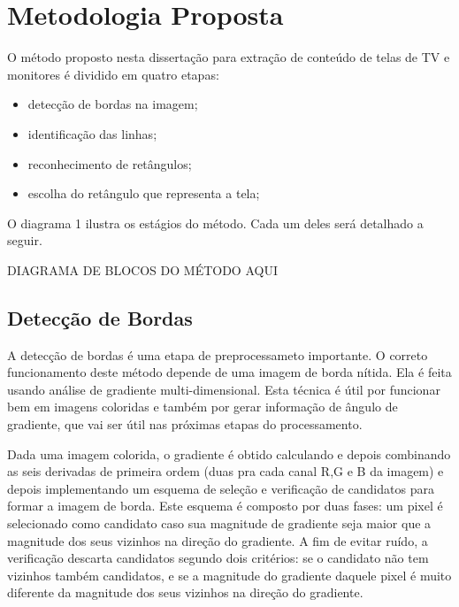 \chapter{Metodologia Proposta}


O método proposto nesta dissertação para extração de conteúdo de telas de TV e monitores é dividido em quatro etapas:

\begin{itemize}
 \item detecção de bordas na imagem;
 \item identificação das linhas;
 \item reconhecimento de retângulos;
 \item escolha do retângulo que representa a tela;
\end{itemize}

O diagrama 1 ilustra os estágios do método. Cada um deles será detalhado a seguir.

DIAGRAMA DE BLOCOS DO MÉTODO AQUI

 
\section{Detecção de Bordas}

A detecção de bordas é uma etapa de preprocessameto importante. O correto funcionamento deste método depende de uma imagem de borda nítida. Ela é feita usando análise de gradiente multi-dimensional. Esta técnica é útil por funcionar bem em imagens coloridas e também por gerar informação de ângulo de gradiente, que vai ser útil nas próximas etapas do processamento.

Dada uma imagem colorida, o gradiente é obtido calculando e depois combinando as seis derivadas de primeira ordem (duas pra cada canal R,G e B da imagem) e depois implementando um esquema de seleção e verificação de candidatos para formar a imagem de borda. Este esquema é composto por duas fases: um pixel é selecionado como candidato caso sua magnitude de gradiente seja maior que a magnitude dos seus vizinhos na direção do gradiente. A fim de evitar ruído, a verificação descarta candidatos segundo dois critérios: se o candidato não tem vizinhos também candidatos, e se a magnitude do gradiente daquele pixel é muito diferente da magnitude dos seus vizinhos na direção do gradiente.


